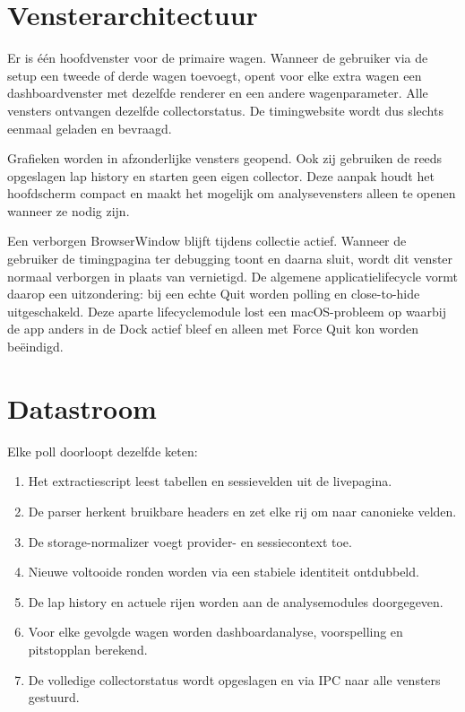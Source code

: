 \section{Vensterarchitectuur}
Er is één hoofdvenster voor de primaire wagen. Wanneer de gebruiker via de setup een tweede of derde wagen toevoegt, opent voor elke extra wagen een dashboardvenster met dezelfde renderer en een andere wagenparameter. Alle vensters ontvangen dezelfde collectorstatus. De timingwebsite wordt dus slechts eenmaal geladen en bevraagd.

Grafieken worden in afzonderlijke vensters geopend. Ook zij gebruiken de reeds opgeslagen lap history en starten geen eigen collector. Deze aanpak houdt het hoofdscherm compact en maakt het mogelijk om analysevensters alleen te openen wanneer ze nodig zijn.

Een verborgen BrowserWindow blijft tijdens collectie actief. Wanneer de gebruiker de timingpagina ter debugging toont en daarna sluit, wordt dit venster normaal verborgen in plaats van vernietigd. De algemene applicatielifecycle vormt daarop een uitzondering: bij een echte Quit worden polling en close-to-hide uitgeschakeld. Deze aparte lifecyclemodule lost een macOS-probleem op waarbij de app anders in de Dock actief bleef en alleen met Force Quit kon worden beëindigd.

\section{Datastroom}
Elke poll doorloopt dezelfde keten:

\begin{enumerate}
  \item Het extractiescript leest tabellen en sessievelden uit de livepagina.
  \item De parser herkent bruikbare headers en zet elke rij om naar canonieke velden.
  \item De storage-normalizer voegt provider- en sessiecontext toe.
  \item Nieuwe voltooide ronden worden via een stabiele identiteit ontdubbeld.
  \item De lap history en actuele rijen worden aan de analysemodules doorgegeven.
  \item Voor elke gevolgde wagen worden dashboardanalyse, voorspelling en pitstopplan berekend.
  \item De volledige collectorstatus wordt opgeslagen en via IPC naar alle vensters gestuurd.
\end{enumerate}

